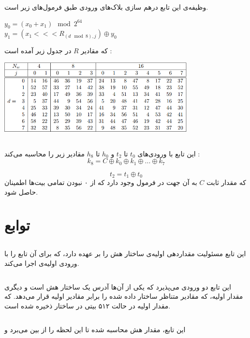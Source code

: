 وظیفه‌ی این تابع درهم سازی بلاک‌های ورودی طبق فرمول‌های زیر است.
\begin{center}
	$y_0 = (x_0 + x_1) \mod 2^{64}$ \\
	$ y_1 = (x_1 <<< R_{(d \mod 8), j}) \oplus y_0$
\end{center}
که مقادیر $ R $ در جدول زیر آمده است :

\begin{center}
	\includegraphics[width=10cm]{images/MIX1.png}
\end{center}




\subsection{}
\label{subsec:TFBIG-INIT}
این تابع با ورودی‌های $ t_0 $ تا $ t_2 $ و $h_0 $ تا $ h_8 $ مقادیر زیر را محاسبه می‌کند :
$$
k_8 = C \oplus k_0 \oplus k_1 \oplus ... \oplus k_7
$$

$$
	t_2 = t_1 \oplus t_0
$$
 که مقدار ثابت $ C $ به آن جهت در فرمول وجود دارد که از ۰ نبودن تمامی بیت‌ها اطمینان حاصل شود.
\section{ توابع}

\subsection{}
\label{subsec:sph-skein512-init}
این تابع مسئولیت مقداردهی اولیه‌ی ساختار هش را بر عهده دارد، که برای آن تابع \hyperref[subsec:skein-big-init]{} را با ورودی‌ اولیه‌ی  اجرا می‌کند.
\subsection{}
\label{subsec:skein-big-init}

این تابع دو ورودی می‌پذیرد که یکی از آن‌ها آدرس یک ساختار هش است و دیگری مقدار اولیه، که مقادیر متناظر ساختار داده شده را برابر مقادیر اولیه قرار می‌دهد.
که مقدار اولیه در حالت ۵۱۲ بیتی در ساختار  ذخیره شده ‌است.

\subsection{}
\label{subsec:sph-skein512}
این تابع، مقدار هش محاسبه شده تا این لحظه را از بین می‌برد و 